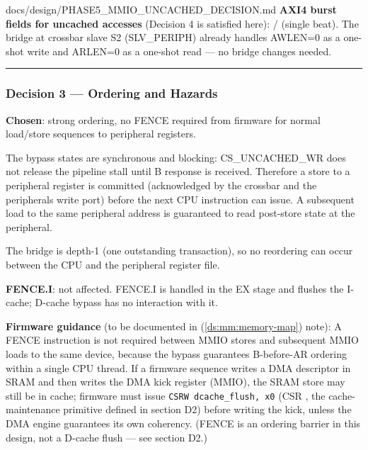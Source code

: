 \begin{relocated}{docs/design/PHASE5_MMIO_UNCACHED_DECISION.md}
\textbf{AXI4 burst fields for uncached accesses} (Decision 4 is
satisfied here):  /  (single beat). The
 bridge at crossbar slave S2
(SLV\_\allowbreak{}PERIPH) already handles AWLEN=0 as a one-shot write
and ARLEN=0 as a one-shot read --- no bridge changes needed.

\begin{center}\rule{0.5\linewidth}{0.5pt}\end{center}

\subsubsection{Decision 3 --- Ordering and Hazards}\label{ds:dec:phase5-mmio-uncached:decision-3-ordering-and-hazards}

\textbf{Chosen}: strong ordering, no FENCE required from firmware for
normal load/\allowbreak{}store sequences to peripheral registers.

The bypass states are synchronous and blocking:
CS\_\allowbreak{}UNCACHED\_\allowbreak{}WR does not release the pipeline
stall until B response is received. Therefore a store to a peripheral
register is committed (acknowledged by the crossbar and the
peripheral\textquotesingle s write port) before the next CPU instruction
can issue. A subsequent load to the same peripheral address is
guaranteed to read post-store state at the peripheral.

The  bridge is depth-1 (one outstanding
transaction), so no reordering can occur between the CPU and the
peripheral register file.

\textbf{FENCE.I}: not affected. FENCE.I is handled in the EX stage and
flushes the I-cache; D-cache bypass has no interaction with it.

\textbf{Firmware guidance} (to be documented in
 (\cref{ds:mm:memory-map}) note): A FENCE instruction is not
required between MMIO stores and subsequent MMIO loads to the same
device, because the bypass guarantees B-before-AR ordering within a
single CPU thread. If a firmware sequence writes a DMA descriptor in
SRAM and then writes the DMA kick register (MMIO), the SRAM store may
still be in cache; firmware must issue
\texttt{CSRW\ dcache\_\allowbreak{}flush,\allowbreak{}\ x0} (CSR
, the cache-maintenance primitive defined in section D2)
before writing the kick, unless the DMA engine guarantees its own
coherency. (FENCE is an ordering barrier in this design, not a D-cache
flush --- see section D2.)


\end{relocated}
